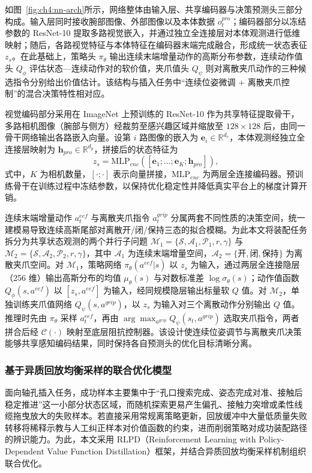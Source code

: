 如图~\ref{fig:ch4:nn-arch}所示，网络整体由输入层、共享编码器与决策预测头三部分构成。输入层同时接收腕部图像、外部图像以及本体数据 $o_t^{pro}$；编码器部分以冻结参数的 ResNet-10 提取多路视觉嵌入，并通过独立全连接层对本体观测进行低维映射；随后，各路视觉特征与本体特征在编码器末端完成融合，形成统一状态表征 $z_s$。在此基础上，策略头 $\pi_\theta$ 输出连续末端增量动作的高斯分布参数，连续动作值头 $Q_\phi$ 评估状态—连续动作对的软价值，夹爪值头 $Q_\psi$ 则对离散夹爪动作的三种候选指令分别给出价值估计。该结构与插入任务中“连续位姿微调 + 离散夹爪控制”的混合决策特性相对应。

视觉编码部分采用在 ImageNet 上预训练的 ResNet-10 作为共享特征提取骨干，多路相机图像（腕部与侧方）经裁剪至感兴趣区域并缩放至 $128\times 128$ 后，由同一骨干网络输出各路嵌入向量。设第 $i$ 路图像的嵌入为 $\mathbf{e}_i\in\mathbb{R}^{d_e}$，本体观测经独立全连接层映射为 $\mathbf{h}_{pro}\in\mathbb{R}^{d_p}$，拼接后的状态特征为
\begin{equation}
z_s=\mathrm{MLP}_{enc}\!\left(\left[\mathbf{e}_1;\ldots;\mathbf{e}_K;\mathbf{h}_{pro}\right]\right),
\end{equation}
式中，$K$ 为相机数量，$[\cdot;\cdot]$ 表示向量拼接，$\mathrm{MLP}_{enc}$ 为两层全连接编码器。预训练骨干在训练过程中冻结参数，以保持优化稳定性并降低真实平台上的梯度计算开销。

连续末端增量动作 $a_t^{eef}$ 与离散夹爪指令 $a_t^{grip}$ 分属两套不同性质的决策空间，统一建模易导致连续高斯尾部对离散开/闭/保持三态的拟合模糊。为此本文将装配任务拆分为共享状态观测的两个并行子问题 $\mathcal{M}_1=\{\mathcal{S},\mathcal{A}_1,\mathcal{P}_1,r,\gamma\}$ 与 $\mathcal{M}_2=\{\mathcal{S},\mathcal{A}_2,\mathcal{P}_2,r,\gamma\}$，其中 $\mathcal{A}_1$ 为连续末端增量空间，$\mathcal{A}_2=\{\text{开},\text{闭},\text{保持}\}$ 为离散夹爪空间。对 $\mathcal{M}_1$，策略网络 $\pi_\theta(a^{eef}|s)$ 以 $z_s$ 为输入，通过两层全连接隐层（256 维）输出高斯分布的均值 $\mu_\theta(s)$ 与对数标准差 $\log\sigma_\theta(s)$；动作值函数 $Q_\phi(s,a^{eef})$ 以 $[z_s,a^{eef}]$ 为输入，经同规模隐层输出标量软 $Q$ 值。对 $\mathcal{M}_2$，单独训练夹爪值网络 $Q_\psi(s,a^{grip})$，以 $z_s$ 为输入对三个离散动作分别输出 $Q$ 值。推理时先由 $\pi_\theta$ 采样 $a_t^{eef}$，再由 $\arg\max_{a^{grip}}Q_\psi(s_t,a^{grip})$ 选取夹爪指令，两者拼合后经 $\mathcal{C}(\cdot)$ 映射至底层阻抗控制器。该设计使连续位姿调节与离散夹爪决策能够共享感知编码结果，同时保持各自预测头的优化目标清晰分离。

\subsubsection{基于异质回放均衡采样的联合优化模型}
面向轴孔插入任务，成功样本主要集中于“孔口搜索完成、姿态完成对准、接触后稳定推进”这一小部分状态区域，而随机探索更易产生偏孔、接触力突增或柔性线缆拖曳放大的失败样本。若直接采用常规离策略更新，回放缓冲中大量低质量失败转移将稀释示教与人工纠正样本对价值函数的约束，进而削弱策略对成功装配路径的辨识能力。为此，本文采用 RLPD（Reinforcement Learning with Policy-Dependent Value Function Distillation）框架，并结合异质回放均衡采样机制组织联合优化。

